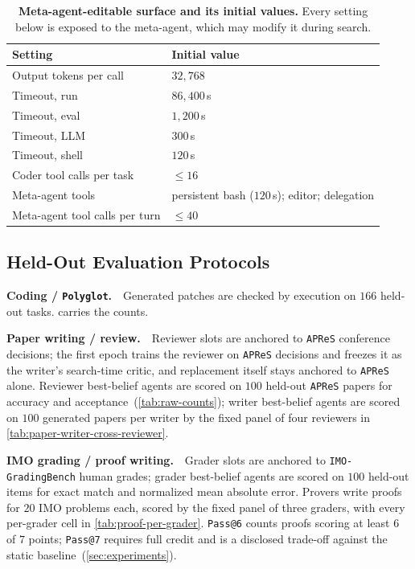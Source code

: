 \documentclass{paper}
\newcommand{\apres}{\texttt{APReS}\xspace}
\newcommand{\polyglot}{\texttt{Polyglot}\xspace}
\newcommand{\imogradbench}{\texttt{IMO-GradingBench}\xspace}
\begin{document}
\begin{table}[ht]
\centering
\caption{\textbf{Meta-agent-editable surface and its initial values.} Every setting below is exposed to the meta-agent, which may modify it during search.}
\label{tab:settings-editable}
\small
\begin{tabular}{@{}ll@{}}
\toprule
Setting & Initial value \\
\midrule
Output tokens per call & $32{,}768$  \\
Timeout, run & $86{,}400$\,s \\
Timeout, eval & $1{,}200$\,s \\
Timeout, LLM & $300$\,s \\
Timeout, shell & $120$\,s \\
Coder tool calls per task & $\leq 16$ \\
Meta-agent tools & persistent bash ($120$\,s); editor; delegation \\
Meta-agent tool calls per turn & $\leq 40$ \\
\bottomrule
\end{tabular}
\end{table}

\subsection{Held-Out Evaluation Protocols}
\label{app:domain-protocols}

\noindent\textbf{Coding / \polyglot.}~~Generated patches are checked by execution on $166$ held-out tasks.  carries the counts.

\noindent\textbf{Paper writing / review.}~~Reviewer slots are anchored to \apres conference decisions; the first epoch trains the reviewer on \apres decisions and freezes it as the writer's search-time critic, and replacement itself stays anchored to \apres alone. Reviewer best-belief agents are scored on $100$ held-out \apres papers for accuracy and acceptance~(\cref{tab:raw-counts}); writer best-belief agents are scored on $100$ generated papers per writer by the fixed panel of four reviewers in \cref{tab:paper-writer-cross-reviewer}.

\noindent\textbf{IMO grading / proof writing.}~~Grader slots are anchored to \imogradbench human grades; grader best-belief agents are scored on $100$ held-out items for exact match and normalized mean absolute error. Provers write proofs for $20$ IMO problems each, scored by the fixed panel of three graders, with every per-grader cell in \cref{tab:proof-per-grader}. \texttt{Pass@6} counts proofs scoring at least $6$ of $7$ points; \texttt{Pass@7} requires full credit and is a disclosed trade-off against the static baseline~(\cref{sec:experiments}).
\end{document}
